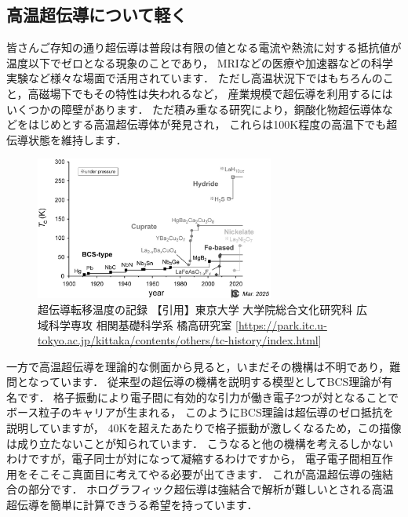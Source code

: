 \documentclass[b5paper,11pt,dvipdfmx]{jsarticle}
\numberwithin{equation}{section}
\theoremstyle{definition}
\begin{document}
\subsection{高温超伝導について軽く}
皆さんご存知の通り超伝導は普段は有限の値となる電流や熱流に対する抵抗値が温度以下でゼロとなる現象のことであり，
MRIなどの医療や加速器などの科学実験など様々な場面で活用されています．
ただし高温状況下ではもちろんのこと，高磁場下でもその特性は失われるなど，
産業規模で超伝導を利用するにはいくつかの障壁があります．
ただ積み重なる研究により，銅酸化物超伝導体などをはじめとする高温超伝導体が発見され，
これらは100K程度の高温下でも超伝導状態を維持します．
\begin{figure}[t]
    \centering
    \includegraphics[width=0.7\textwidth]{fig_kawai/tc-history_2025_bw.jpg}
    \caption{超伝導転移温度の記録 【引用】東京大学 大学院総合文化研究科 広域科学専攻 相関基礎科学系 橘高研究室 [\url{https://park.itc.u-tokyo.ac.jp/kittaka/contents/others/tc-history/index.html}]}
    \label{fig:tc-history}
\end{figure}
一方で高温超伝導を理論的な側面から見ると，いまだその機構は不明であり，難問となっています．
従来型の超伝導の機構を説明する模型としてBCS理論が有名です．
格子振動により電子間に有効的な引力が働き電子2つが対となることでボース粒子のキャリアが生まれる，
このようにBCS理論は超伝導のゼロ抵抗を説明していますが，
40Kを超えたあたりで格子振動が激しくなるため，この描像は成り立たないことが知られています．
こうなると他の機構を考えるしかないわけですが，電子同士が対になって凝縮するわけですから，
電子電子間相互作用をそこそこ真面目に考えてやる必要が出てきます．
これが高温超伝導の強結合の部分です．
ホログラフィック超伝導は強結合で解析が難しいとされる高温超伝導を簡単に計算できうる希望を持っています．
\end{document}
